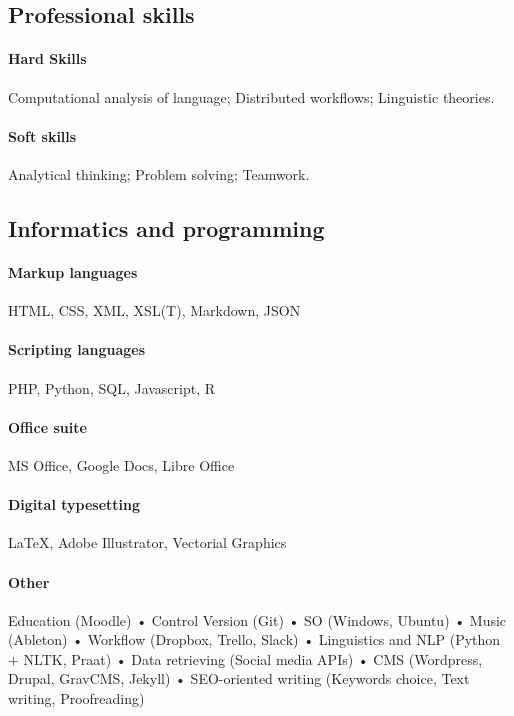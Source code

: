 \documentclass[9pt, a4paper]{article}
\begin{document}
\subsection{Professional skills}
\paragraph{Hard Skills}
Computational analysis of language; Distributed workflows; Linguistic theories.
\paragraph{Soft skills}  
Analytical thinking; Problem solving; Teamwork. 






\subsection{Informatics and programming}
\paragraph{Markup languages} HTML, CSS, XML, XSL(T), Markdown, JSON
\paragraph{Scripting languages}  PHP, Python, SQL, Javascript, R
\paragraph{Office suite}  MS Office, Google Docs, Libre Office
\paragraph{Digital typesetting} \LaTeX, Adobe Illustrator, Vectorial Graphics
\paragraph{Other} Education (Moodle) • Control Version (Git) • SO (Windows, Ubuntu) • Music (Ableton) • Workflow (Dropbox, Trello, Slack) • Linguistics and NLP (Python + NLTK, Praat) • Data retrieving (Social media APIs) • CMS (Wordpress, Drupal, GravCMS, Jekyll) • SEO-oriented writing (Keywords choice, Text writing, Proofreading) \\


\end{document}
